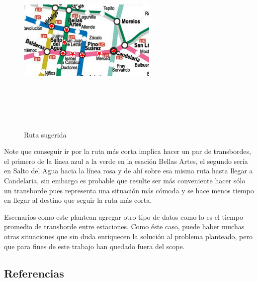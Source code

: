 \documentclass[
]{article}
\begin{document}
\begin{figure}
\centering
\includegraphics[width=0.6\textwidth,height=3.64583in]{Imagenes/Ruta_sugerida.png}
\caption{Ruta sugerida}
\end{figure}

Note que conseguir ir por la ruta más corta implica hacer un par de
transbordes, el primero de la línea azul a la verde en la esación Bellas
Artes, el segundo sería en Salto del Agua hacia la línea rosa y de ahí
sobre esa misma ruta hasta llegar a Candelaria, sin embargo es probable
que resulte ser más conveniente hacer sólo un transborde pues representa
una situación más cómoda y se hace menos tiempo en llegar al destino que
seguir la ruta más corta.

Escenarios como este plantean agregar otro tipo de datos como lo es el
tiempo promedio de transborde entre estaciones. Como éste caso, puede
haber muchas otras situaciones que sin duda enriquecen la solución al
problema planteado, pero que para fines de este trabajo han quedado
fuera del scope.

\hypertarget{referencias}{%
\subsection*{Referencias}\label{referencias}}
\end{document}
